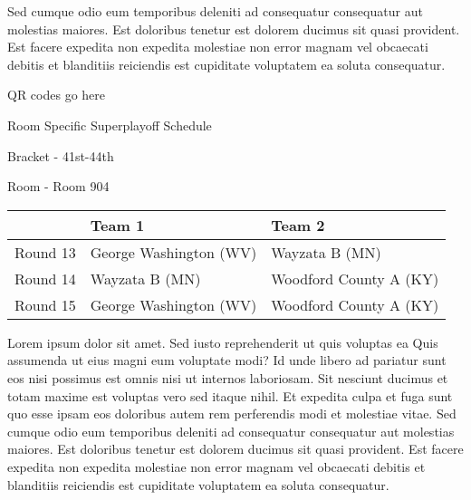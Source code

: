 \documentclass{article}%
\begin{document}
\newline%
Sed cumque odio eum temporibus deleniti ad consequatur consequatur aut molestias maiores. Est doloribus tenetur est dolorem ducimus sit quasi provident. Est facere expedita non expedita molestiae non error magnam vel obcaecati debitis et blanditiis reiciendis est cupiditate voluptatem ea soluta consequatur.%
\vspace*{140pt}%
\begin{center}%
\begin{Huge}%
QR codes go here%
\end{Huge}%
\end{center}%
\newpage%
\begin{center}%
\begin{Huge}%
Room Specific Superplayoff Schedule%
\end{Huge}%
\vspace*{8pt}%
\linebreak%
\begin{Large}%
Bracket {-} 41st{-}44th%
\end{Large}%
\vspace*{8pt}%
\linebreak%
\vspace*{8pt}%
\begin{Large}%
Room {-} Room 904%
\end{Large}%
\end{center}%
%
\begin{tabularx}{\textwidth}{|c|Y|Y|}%
\hline%
&Team 1&Team 2\\%
\hline%
Round 13&George Washington (WV)&Wayzata B (MN)\\%
Round 14&Wayzata B (MN)&Woodford County A (KY)\\%
Round 15&George Washington (WV)&Woodford County A (KY)\\%
\hline%
\end{tabularx}%
\vspace*{8pt}%
\newline%
Lorem ipsum dolor sit amet. Sed iusto reprehenderit ut quis voluptas ea Quis assumenda ut eius magni eum voluptate modi? Id unde libero ad pariatur sunt eos nisi possimus est omnis nisi ut internos laboriosam. Sit nesciunt ducimus et totam maxime est voluptas vero sed itaque nihil. Et expedita culpa et fuga sunt quo esse ipsam eos doloribus autem rem perferendis modi et molestiae vitae.\newline%
\newline%
Sed cumque odio eum temporibus deleniti ad consequatur consequatur aut molestias maiores. Est doloribus tenetur est dolorem ducimus sit quasi provident. Est facere expedita non expedita molestiae non error magnam vel obcaecati debitis et blanditiis reiciendis est cupiditate voluptatem ea soluta consequatur.%
\end{document}
